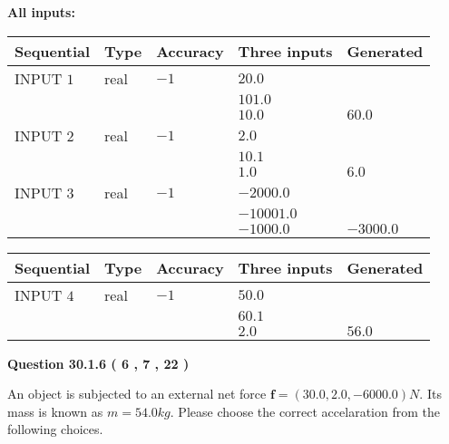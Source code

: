 \documentclass[12pt]{article}
\begin{document}
   
   
   
\noindent\vspace{0.1in}\hspace{-0.08in} {\textbf{\Large{All inputs: }}}
   
   
  
  
\noindent\begin{tabular}{|l|l|l|l|l|}
\hline
 Sequential & Type & Accuracy & Three inputs & Generated \\ 
\hline
 
 
  INPUT $            1 $ & real & $           -1  $ & $
 20.0
  $ & \\
  & & &  $
 101.0
  $ & \\
  & & &  $
 10.0
 $ & $ 60.0 $ 
 \\  \hline  
 
 
  INPUT $            2 $ & real & $           -1  $ & $
 2.0
  $ & \\
  & & &  $
 10.1
  $ & \\
  & & &  $
 1.0
 $ & $ 6.0 $ 
 \\  \hline  
 
 
  INPUT $            3 $ & real & $           -1  $ & $
 -2000.0
  $ & \\
  & & &  $
 -10001.0
  $ & \\
  & & &  $
 -1000.0
 $ & $ -3000.0 $ 
 \\  \hline  
 \end{tabular}
   
   
  
  
\noindent\begin{tabular}{|l|l|l|l|l|}
\hline
 Sequential & Type & Accuracy & Three inputs & Generated \\ 
\hline
 
 
  INPUT $            4 $ & real & $           -1  $ & $
 50.0
  $ & \\
  & & &  $
 60.1
  $ & \\
  & & &  $
 2.0
 $ & $ 56.0 $ 
 \\  \hline  
 \end{tabular}
   
   
  
\vspace{0.2in}
  
{\textbf{\Large{Question
30.1.6 
 (           6 ,           7 ,          22 )
}}}
  
  
 
An object is subjected to an external net force $\mathbf{f}=(
30.0 ,
2.0,
-6000.0  )N$. Its mass is known as
$m= %
54.0  kg$. Please choose the correct accelaration
from the following choices.
 
\end{document}

